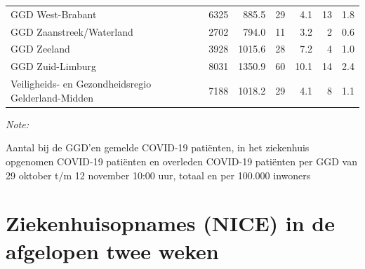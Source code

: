 \documentclass[
  english,
  man,floatsintext]{apa6}
\begin{document}
\begin{table}
\begin{threeparttable}
\begin{tabular}{lrrrrrr}
GGD West-Brabant & 6325 & 885.5 & 29 & 4.1 & 13 & 1.8\\
GGD Zaanstreek/Waterland & 2702 & 794.0 & 11 & 3.2 & 2 & 0.6\\
GGD Zeeland & 3928 & 1015.6 & 28 & 7.2 & 4 & 1.0\\
GGD Zuid-Limburg & 8031 & 1350.9 & 60 & 10.1 & 14 & 2.4\\
Veiligheids- en Gezondheidsregio Gelderland-Midden & 7188 & 1018.2 & 29 & 4.1 & 8 & 1.1\\
\bottomrule
\end{tabular}
\begin{tablenotes}
\item \textit{Note: } 
\item Aantal bij de GGD’en gemelde COVID-19 patiënten, in het ziekenhuis opgenomen COVID-19 patiënten en overleden COVID-19 patiënten per GGD van 29 oktober t/m 12 november 10:00 uur, totaal en per 100.000 inwoners
\end{tablenotes}
\end{threeparttable}
\endgroup{}
\end{table}

\newpage

\hypertarget{ziekenhuisopnames-nice-in-de-afgelopen-twee-weken}{%
\section{Ziekenhuisopnames (NICE) in de afgelopen twee weken}\label{ziekenhuisopnames-nice-in-de-afgelopen-twee-weken}}
\end{document}
